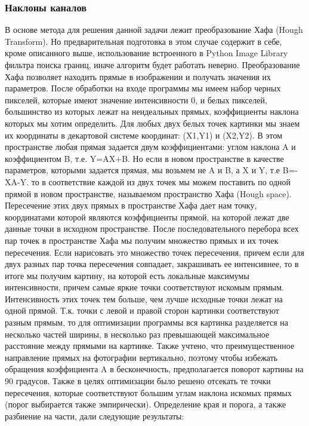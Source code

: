 \documentclass[letterpaper,10pt,russian]{/usr/lib/python3.3/site-packages/sphinx/texinputs/sphinxhowto}
\begin{document}
\subsubsection{Наклоны каналов}
В основе метода для решения данной задачи лежит преобразование Хафа
(Hough Transform). Но предварительная подготовка в этом случае содержит
в себе, кроме описанного выше, использование встроенного в Python Image
Library фильтра поиска границ, иначе алгоритм будет работать неверно. Преобразование Хафа позволяет находить прямые в изображении и получать
значения их параметров. После обработки на входе программы мы имеем
набор черных пикселей, которые имеют значение интенсивности 0, и белых
пикселей, большинство из которых лежат на неидеальных прямых,
коэффициенты наклона которых мы хотим определить. Для любых двух белых
точек картинки мы знаем их координаты в декартовой системе координат:
(X1,Y1) и (X2,Y2). В этом пространстве любая прямая задается двум
коэффициентами: углом наклона A и коэффициентом B, т.е. Y=AX+B. Но если
в новом пространстве в качестве параметров, которыми задается прямая, мы
возьмем не A и B, а X и Y, т.е B=-XA-Y. то в соответствие каждой из двух
точек мы можем поставить по одной прямой в новом пространстве,
называемом пространство Хафа (Hough space). Пересечение этих двух прямых
в пространстве Хафа дает нам точку, координатами которой являются
коэффициенты прямой, на которой лежат две данные точки в исходном
пространстве. После последовательного перебора всех пар точек в
пространстве Хафа мы получим множество прямых и их точек пересечения.
Если нарисовать это множество точек пересечения, причем если для двух
разных пар точка пересечения совпадает, закрашивать ее интенсивнее, то в
итоге мы получим картину, на которой есть локальные максимумы
интенсивности, причем самые яркие точки соответствуют искомым прямым.
Интенсивность этих точек тем больше, чем лучше исходные точки лежат на
одной прямой. Т.к. точки с левой и правой сторон картинки соответствуют
разным прямым, то для оптимизации программы вся картинка разделяется на
несколько частей ширины, в несколько раз превышающей максимальное
расстояние между прямыми на картинке. Также учтено, что преимущественное
направление прямых на фотографии вертикально, поэтому чтобы избежать
обращения коэффициента A в бесконечность, предполагается поворот картины
на 90 градусов. Также в целях оптимизации было решено отсекать те точки
пересечения, которые соответствуют большим углам наклона искомых прямых
(порог выбирается также эмпирически).
Определение края и порога, а также разбиение на части, дали следующие
результаты:
\FloatBarrier
\end{document}
